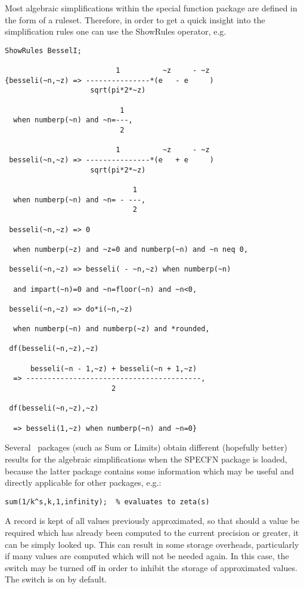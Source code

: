 Most algebraic simplifications within the special function package 
are defined in the form of a \REDUCE{} ruleset. Therefore, in order to
get a quick insight into the simplification rules one can use the
ShowRules operator, e.g.
\begin{verbatim}
ShowRules BesselI;

                          1          ~z     - ~z
{besseli(~n,~z) => ---------------*(e   - e     )
                    sqrt(pi*2*~z)

                           1
  when numberp(~n) and ~n=---,
                           2

                          1          ~z     - ~z
 besseli(~n,~z) => ---------------*(e   + e     )
                    sqrt(pi*2*~z)

                              1
  when numberp(~n) and ~n= - ---,
                              2

 besseli(~n,~z) => 0

  when numberp(~z) and ~z=0 and numberp(~n) and ~n neq 0,

 besseli(~n,~z) => besseli( - ~n,~z) when numberp(~n)

  and impart(~n)=0 and ~n=floor(~n) and ~n<0,

 besseli(~n,~z) => do*i(~n,~z)

  when numberp(~n) and numberp(~z) and *rounded,

 df(besseli(~n,~z),~z)

      besseli(~n - 1,~z) + besseli(~n + 1,~z)
  => -----------------------------------------,
                         2

 df(besseli(~n,~z),~z)

  => besseli(1,~z) when numberp(~n) and ~n=0}
\end{verbatim}
Several \REDUCE\ packages (such as Sum or Limits) obtain different
(hopefully better)
results for the algebraic simplifications when the SPECFN package 
is loaded, because the latter package contains some information which
may be useful and directly applicable for other packages, e.g.:

\begin{verbatim}
sum(1/k^s,k,1,infinity);  % evaluates to zeta(s)
\end{verbatim}

A record is kept of all values previously approximated, so that should a
value be required which has already been computed to the current
precision or greater, it can be simply looked up.  This can result in
some storage overheads, particularly if many values are computed which
will not be needed again.  In this case, the switch  may be
turned off in order to inhibit the storage of approximated values.  The
switch is on by default.


